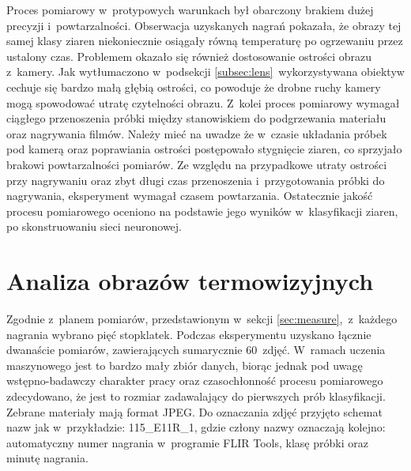 Proces pomiarowy w~protypowych warunkach był obarczony brakiem dużej precyzji
i~powtarzalności.
Obserwacja uzyskanych nagrań pokazała, że obrazy tej samej klasy ziaren
niekoniecznie osiągały równą temperaturę po ogrzewaniu przez ustalony czas.
Problemem okazało się również dostosowanie ostrości obrazu z~kamery.
Jak wytłumaczono w~podsekcji \ref{subsec:lens}~wykorzystywana obiektyw cechuje
się bardzo małą głębią ostrości, co powoduje że drobne ruchy kamery mogą
spowodować utratę czytelności obrazu.
Z~kolei proces pomiarowy wymagał ciągłego przenoszenia próbki między
stanowiskiem do podgrzewania materiału oraz nagrywania filmów.
Należy mieć na uwadze że w~czasie układania próbek pod kamerą oraz poprawiania
ostrości postępowało stygnięcie ziaren, co sprzyjało brakowi powtarzalności
pomiarów.
Ze względu na przypadkowe utraty ostrości przy nagrywaniu oraz zbyt długi czas
przenoszenia i~przygotowania próbki do nagrywania, eksperyment wymagał czasem
powtarzania.
Ostatecznie jakość procesu pomiarowego oceniono na podstawie jego wyników
w~klasyfikacji ziaren, po skonstruowaniu sieci neuronowej.

\section{Analiza obrazów termowizyjnych}
Zgodnie z~planem pomiarów, przedstawionym w~sekcji \ref{sec:measure},~z~każdego
nagrania wybrano pięć stopklatek.
Podczas eksperymentu uzyskano łącznie dwanaście pomiarów, zawierających
sumarycznie 60~zdjęć.
W~ramach uczenia maszynowego jest to bardzo mały zbiór danych, biorąc jednak
pod uwagę wstępno-badawczy charakter pracy oraz czasochłonność procesu
pomiarowego zdecydowano, że jest to rozmiar zadawalający do pierwszych prób
klasyfikacji.
Zebrane materiały mają format JPEG.
Do oznaczania zdjęć przyjęto schemat nazw jak w~przykładzie: 115\_E11R\_1, gdzie
człony nazwy oznaczają kolejno: automatyczny numer nagrania w~programie FLIR
Tools, klasę próbki oraz minutę nagrania.

